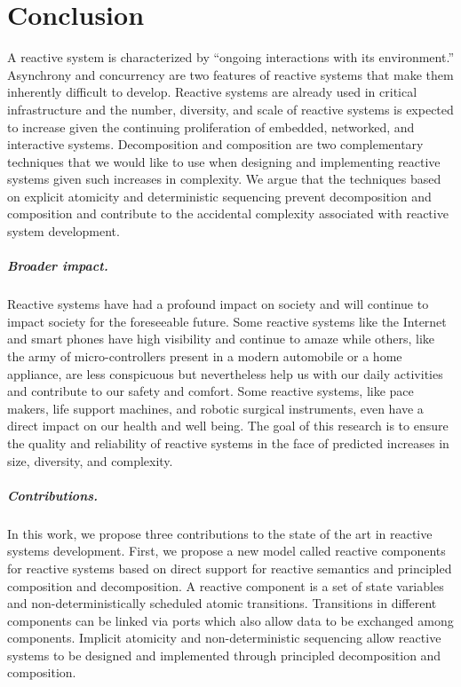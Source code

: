 \chapter{Conclusion}
\label{conclusion}

A reactive system is characterized by ``ongoing interactions with its environment\cite{manna1992temporal}.''
Asynchrony and concurrency are two features of reactive systems that make them inherently difficult to develop.
Reactive systems are already used in critical infrastructure and the number, diversity, and scale of reactive systems is expected to increase given the continuing proliferation of embedded, networked, and interactive systems.
Decomposition and composition are two complementary techniques that we would like to use when designing and implementing reactive systems given such increases in complexity.
We argue that the techniques based on explicit atomicity and deterministic sequencing prevent decomposition and composition and contribute to the accidental complexity associated with reactive system development.

\paragraph{Broader impact.}
Reactive systems have had a profound impact on society and will continue to impact society for the foreseeable future.
Some reactive systems like the Internet and smart phones have high visibility and continue to amaze while others, like the army of micro-controllers present in a modern automobile or a home appliance, are less conspicuous but nevertheless help us with our daily activities and contribute to our safety and comfort.
Some reactive systems, like pace makers, life support machines, and robotic surgical instruments, even have a direct impact on our health and well being.
The goal of this research is to ensure the quality and reliability of reactive systems in the face of predicted increases in size, diversity, and complexity.

\paragraph{Contributions.}
In this work, we propose three contributions to the state of the art in reactive systems development.
First, we propose a new model called reactive components for reactive systems based on direct support for reactive semantics and principled composition and decomposition.
A reactive component is a set of state variables and non-deterministically scheduled atomic transitions.
Transitions in different components can be linked via ports which also allow data to be exchanged among components.
Implicit atomicity and non-deterministic sequencing allow reactive systems to be designed and implemented through principled decomposition and composition.

